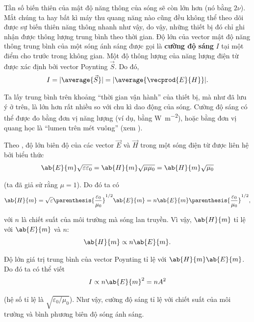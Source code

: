 \noindent
Tần số biến thiên của mật độ năng thông của sóng sẽ còn lớn hơn (nó bằng $2\nu$).
Mắt chúng ta hay bất kì máy thu quang năng nào cũng đều không thể theo dõi được sự biến thiên năng thông nhanh như vậy, do vậy, những thiết bị đó chỉ ghi nhận được thông lượng trung bình theo thời gian. Độ lớn của vector mật độ năng thông trung bình của một sóng ánh sáng được gọi là \textbf{cường độ sáng} $I$ tại một điểm cho trước trong không gian.
Một độ thông lượng của năng lượng điện từ được xác định bởi vector Poynting $\vec{S}$.
Do đó,
\begin{equation}\label{eq:16_7}
    I = |\average{\vec{S}}| = |\average{\vecprod{E}{H}}|.
\end{equation}

\noindent
Ta lấy trung bình trên khoảng ``thời gian vận hành'' của thiết bị, mà như đã lưu ý ở trên, là lớn hơn rất nhiều so với chu kì dao động của sóng.
Cường độ sáng có thể được đo bằng đơn vị năng lượng (ví dụ, bằng \si{\watt\per\metre\squared}), hoặc bằng đơn vị quang học là ``lumen trên mét vuông'' (xem ).

Theo , độ lớn biên độ của các vector $\vec{E}$ và $\vec{H}$ trong một sóng điện từ được liên hệ bởi biểu thức
\begin{equation*}
    \ab{E}{m} \sqrt{\varepsilon\varepsilon_0} = \ab{H}{m} \sqrt{\mu\mu_0} = \ab{H}{m} \sqrt{\mu_0}
\end{equation*}

\noindent
(ta đã giả sử rằng $\mu=1$).
Do đó ta có
\begin{equation*}
    \ab{H}{m} = \sqrt{\varepsilon} \parenthesis{\frac{\varepsilon_0}{\mu_0}}^{1/2} \ab{E}{m} = n \ab{E}{m} \parenthesis{\frac{\varepsilon_0}{\mu_0}}^{1/2},
\end{equation*}

\noindent
với $n$ là chiết suất của môi trường mà sóng lan truyền.
Vì vậy, $\ab{H}{m}$ tỉ lệ với $\ab{E}{m}$ và $n$:
\begin{equation}\label{eq:16_8}
    \ab{H}{m} \propto n \ab{E}{m}.
\end{equation}

\noindent
Độ lớn giá trị trung bình của vector Poynting tỉ lệ với $\ab{H}{m}\ab{E}{m}$. Do đó ta có thể viết
\begin{equation}\label{eq:16_9}
    I \propto n \ab{E}{m}^2 = n A^2
\end{equation}

\noindent
(hệ số tỉ lệ là $\sqrt{\varepsilon_0/\mu_0}$).
Như vậy, cường độ sáng tỉ lệ với chiết suất của môi trường và bình phương biên độ sóng ánh sáng.

